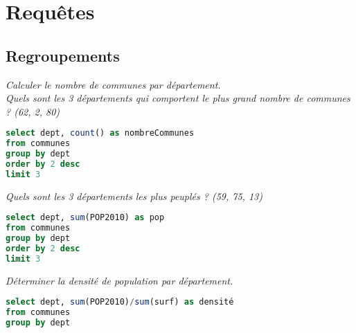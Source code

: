 \section{Requêtes}
\subsection{Regroupements}
\begin{Exercise}
\it Calculer le nombre de communes par département.\\
Quels sont les 3 départements qui comportent le plus grand nombre de communes ? (62, 2, 80)
\end{Exercise}
\begin{Answer}
\begin{lstlisting}[language=SQL]
select dept, count() as nombreCommunes
from communes
group by dept
order by 2 desc
limit 3
\end{lstlisting}
\end{Answer}
\begin{Exercise}
\it Quels sont les 3 départements les plus peuplés ?
(59, 75, 13)
\end{Exercise}
\begin{Answer}
\begin{lstlisting}[language=SQL]
select dept, sum(POP2010) as pop
from communes
group by dept
order by 2 desc
limit 3
\end{lstlisting}
\end{Answer}
\begin{Exercise}
\it Déterminer la densité de population par département.
\end{Exercise}
\begin{Answer}
\begin{lstlisting}[language=SQL]
select dept, sum(POP2010)/sum(surf) as densité
from communes
group by dept
\end{lstlisting}
\end{Answer}
